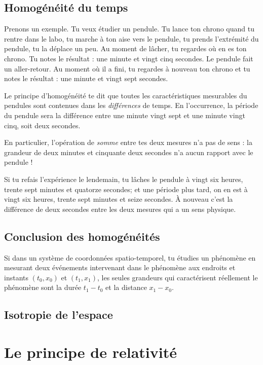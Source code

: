 \subsection{Homogénéité du temps}

Prenons un exemple. Tu veux étudier un pendule. Tu lance ton chrono quand tu rentre dans le labo, tu marche à ton aise vers le pendule, tu prends l'extrémité du pendule, tu la déplace un peu. Au moment de lâcher, tu regardes où en es ton chrono. Tu notes le résultat : une minute et vingt cinq secondes. Le pendule fait un aller-retour. Au moment où il a fini, tu regardes à nouveau ton chrono et tu notes le résultat : une minute et vingt sept secondes.

Le principe d'homogénéité te dit que toutes les caractéristiques mesurables du pendules sont contenues dans les \emph{différences} de temps. En l'occurrence, la période du pendule sera la différence entre une minute vingt sept et une minute vingt cinq, soit deux secondes.

En particulier, l'opération de \emph{somme} entre tes deux mesures n'a pas de sens : la grandeur de deux minutes et cinquante deux secondes n'a aucun rapport avec le pendule !

Si tu refais l'expérience le lendemain, tu lâches le pendule à vingt six heures, trente sept minutes et quatorze secondes; et une période plus tard, on en est à vingt six heures, trente sept minutes et seize secondes. À nouveau c'est la différence de deux secondes entre les deux mesures qui a un sens physique.

\subsection{Conclusion des homogénéités}		\label{SecConcHomo}

Si dans un système de coordonnées spatio-temporel, tu étudies un phénomène en mesurant deux événements intervenant dans le phénomène aux endroits et instants $(t_0,x_0)$ et $(t_1,x_1)$, les seules grandeurs qui caractérisent réellement le phénomène sont la durée $t_1-t_0$ et la distance $x_1-x_0$.

\subsection{Isotropie de l'espace}


\section{Le principe de relativité}

